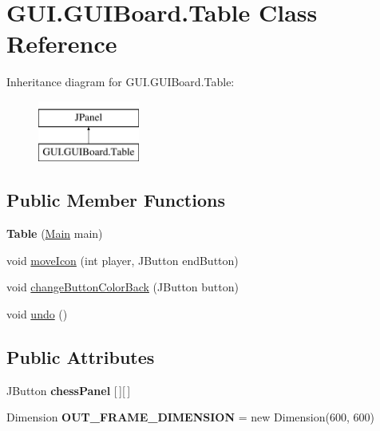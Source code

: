 \hypertarget{class_g_u_i_1_1_g_u_i_board_1_1_table}{}\section{G\+U\+I.\+G\+U\+I\+Board.\+Table Class Reference}
\label{class_g_u_i_1_1_g_u_i_board_1_1_table}
Inheritance diagram for G\+U\+I.\+G\+U\+I\+Board.\+Table\+:\begin{figure}[H]
\begin{center}
\leavevmode
\includegraphics[height=2.000000cm]{class_g_u_i_1_1_g_u_i_board_1_1_table}
\end{center}
\end{figure}
\subsection*{Public Member Functions}
\begin{DoxyCompactItemize}
\item 
\mbox{\label{class_g_u_i_1_1_g_u_i_board_1_1_table_a82aa9ac4273939eee2c6ca71c814c622}} 
{\bfseries Table} (\mbox{\hyperlink{class_g_u_i_1_1_main}{Main}} main)
\item 
void \mbox{\hyperlink{class_g_u_i_1_1_g_u_i_board_1_1_table_a311b401d6ee3d8e7a391a6b20e476de4}{move\+Icon}} (int player, J\+Button end\+Button)
\item 
void \mbox{\hyperlink{class_g_u_i_1_1_g_u_i_board_1_1_table_a4cfeeb28e2ada796495560fc712ed32f}{change\+Button\+Color\+Back}} (J\+Button button)
\item 
void \mbox{\hyperlink{class_g_u_i_1_1_g_u_i_board_1_1_table_abb7c7199330206d15dc1b072f93ecf6e}{undo}} ()
\end{DoxyCompactItemize}
\subsection*{Public Attributes}
\begin{DoxyCompactItemize}
\item 
\mbox{\label{class_g_u_i_1_1_g_u_i_board_1_1_table_ab201418f9a4e484b19f11d0d8880c49a}} 
J\+Button {\bfseries chess\+Panel} \mbox{[}$\,$\mbox{]}\mbox{[}$\,$\mbox{]}
\item 
\mbox{\label{class_g_u_i_1_1_g_u_i_board_1_1_table_a13dfe45b9428e15f35a1f0bd5054ace4}} 
Dimension {\bfseries O\+U\+T\+\_\+\+F\+R\+A\+M\+E\+\_\+\+D\+I\+M\+E\+N\+S\+I\+ON} = new Dimension(600, 600)
\end{DoxyCompactItemize}


